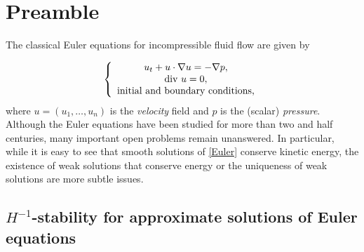 \documentclass[11pt, a4paper,leqno]{amsart}
\theoremstyle{plain}
\numberwithin{equation}{section}
\theoremstyle{definition}
\theoremstyle{remark}
\def\R{\mathbb{R}}
\begin{document}
\section{Preamble\label{sec:preambulo}}

The classical Euler equations for incompressible fluid flow are given by%

\begin{equation}
\left\{
\begin{array}
[c]{c}%
u_{t}+u\cdot\nabla u=-\nabla p,\\
\text{div }u=0,\\
\text{initial and boundary conditions,}%
\end{array}
\right.  \label{Euler}%
\end{equation}
where $u=(u_{1},\ldots,u_{n})$ is the \emph{velocity} field and $p$ is the
(scalar) \emph{pressure}. Although the Euler equations have been studied for more than two and half
centuries, many important open problems remain unanswered. In particular, while it is
easy to see that smooth solutions of \eqref{Euler} conserve kinetic energy, the existence of
weak solutions that conserve energy or the uniqueness of weak solutions are
more subtle issues. 




\subsection{$H^{-1}$-stability for approximate solutions of Euler equations}\label{Section1Intro}
\end{document}
